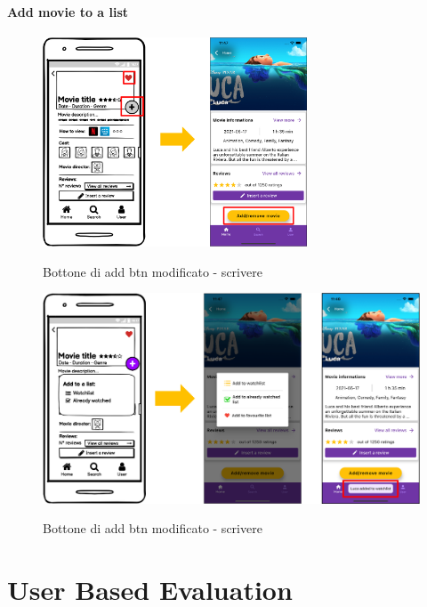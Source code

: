 \documentclass[12pt, a4paper]{article}
\numberwithin{figure}{section}
\begin{document}
\paragraph{Add movie to a list}
\mbox{}
\begin{figure}[H]
	\centering
	\includegraphics[width=0.7\textwidth]{images/prototype1/addBtn.png}\\
	\caption{Bottone di add btn modificato - scrivere}
\end{figure}
\begin{figure}[H]
	\centering
	\includegraphics[width=1\textwidth]{images/prototype1/addToList.png}\\
	\caption{Bottone di add btn modificato - scrivere}
\end{figure}


\newpage

\section{User Based Evaluation}
\end{document}

